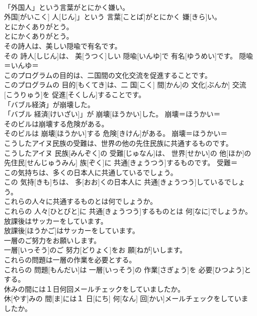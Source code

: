\documentclass[8pt]{extreport}
\begin{document}
\begin{CJK}{UTF8}{min}
\\	「外国人」という言葉がとにかく嫌い。	
\\	外国[がいこく] 人[じん]」という 言葉[ことば]がとにかく 嫌[きら]い。	
\\	とにかくありがとう。	
\\	とにかくありがとう。	
\\	その詩人は、美しい隠喩で有名です。	
\\	その 詩人[しじん]は、 美[うつく]しい 隠喩[いんゆ]で 有名[ゆうめい]です。	隠喩＝いんゆ＝ 
\\	このプログラムの目的は、二国間の文化交流を促進することです。	
\\	このプログラムの 目的[もくてき]は、二 国[こく] 間[かん]の 文化[ぶんか] 交流[こうりゅう]を 促進[そくしん]することです。	
\\	「バブル経済」が崩壊した。	
\\	「バブル 経済[けいざい]」が 崩壊[ほうかい]した。	崩壊＝ほうかい＝ 
\\	そのビルは崩壊する危険がある。	
\\	そのビルは 崩壊[ほうかい]する 危険[きけん]がある。	崩壊＝ほうかい＝ 
\\	こうしたアイヌ民族の受難は、世界の他の先住民族に共通するものです。	
\\	こうしたアイヌ 民族[みんぞく]の 受難[じゅなん]は、 世界[せかい]の 他[ほか]の 先住民[せんじゅうみん] 族[ぞく]に 共通[きょうつう]するものです。	受難＝
\\	この気持ちは、多くの日本人に共通しているでしょう。	
\\	この 気持[きも]ちは、 多[おお]くの日本人に 共通[きょうつう]しているでしょう。	
\\	これらの人々に共通するものとは何でしょうか。	
\\	これらの 人々[ひとびと]に 共通[きょうつう]するものとは 何[なに]でしょうか。	
\\	放課後はサッカーをしています。	
\\	放課後[ほうかご]はサッカーをしています。	
\\	一層のご努力をお願いします。	
\\	一層[いっそう]のご 努力[どりょく]をお 願[ねが]いします。	
\\	これらの問題は一層の作業を必要とする。	
\\	これらの 問題[もんだい]は 一層[いっそう]の 作業[さぎょう]を 必要[ひつよう]とする。	
\\	休みの間には１日何回メールチェックをしていましたか。	
\\	休[やす]みの 間[ま]には１ 日[にち] 何[なん] 回[かい]メールチェックをしていましたか。	

\end{CJK}
\end{document}
